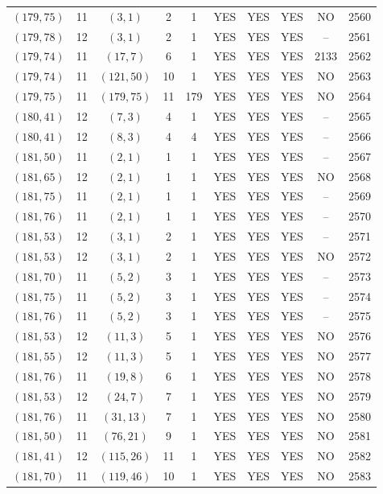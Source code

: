 \begin{longtable}{|c|c|c|c|c|c|c|c|c|c|}
$(179, 75)$ & 11 & $(3, 1)$ & 2 & 1 & YES & YES & YES & NO & 2560\\
$(179, 78)$ & 12 & $(3, 1)$ & 2 & 1 & YES & YES & YES & -- & 2561\\
$(179, 74)$ & 11 & $(17, 7)$ & 6 & 1 & YES & YES & YES & 2133 & 2562\\
$(179, 74)$ & 11 & $(121, 50)$ & 10 & 1 & YES & YES & YES & NO & 2563\\
$(179, 75)$ & 11 & $(179, 75)$ & 11 & 179 & YES & YES & YES & NO & 2564\\
$(180, 41)$ & 12 & $(7, 3)$ & 4 & 1 & YES & YES & YES & -- & 2565\\
$(180, 41)$ & 12 & $(8, 3)$ & 4 & 4 & YES & YES & YES & -- & 2566\\
$(181, 50)$ & 11 & $(2, 1)$ & 1 & 1 & YES & YES & YES & -- & 2567\\
$(181, 65)$ & 12 & $(2, 1)$ & 1 & 1 & YES & YES & YES & NO & 2568\\
$(181, 75)$ & 11 & $(2, 1)$ & 1 & 1 & YES & YES & YES & -- & 2569\\
$(181, 76)$ & 11 & $(2, 1)$ & 1 & 1 & YES & YES & YES & -- & 2570\\
$(181, 53)$ & 12 & $(3, 1)$ & 2 & 1 & YES & YES & YES & -- & 2571\\
$(181, 53)$ & 12 & $(3, 1)$ & 2 & 1 & YES & YES & YES & NO & 2572\\
$(181, 70)$ & 11 & $(5, 2)$ & 3 & 1 & YES & YES & YES & -- & 2573\\
$(181, 75)$ & 11 & $(5, 2)$ & 3 & 1 & YES & YES & YES & -- & 2574\\
$(181, 76)$ & 11 & $(5, 2)$ & 3 & 1 & YES & YES & YES & -- & 2575\\
$(181, 53)$ & 12 & $(11, 3)$ & 5 & 1 & YES & YES & YES & NO & 2576\\
$(181, 55)$ & 12 & $(11, 3)$ & 5 & 1 & YES & YES & YES & NO & 2577\\
$(181, 76)$ & 11 & $(19, 8)$ & 6 & 1 & YES & YES & YES & NO & 2578\\
$(181, 53)$ & 12 & $(24, 7)$ & 7 & 1 & YES & YES & YES & NO & 2579\\
$(181, 76)$ & 11 & $(31, 13)$ & 7 & 1 & YES & YES & YES & NO & 2580\\
$(181, 50)$ & 11 & $(76, 21)$ & 9 & 1 & YES & YES & YES & NO & 2581\\
$(181, 41)$ & 12 & $(115, 26)$ & 11 & 1 & YES & YES & YES & NO & 2582\\
$(181, 70)$ & 11 & $(119, 46)$ & 10 & 1 & YES & YES & YES & NO & 2583\\

\end{longtable}

